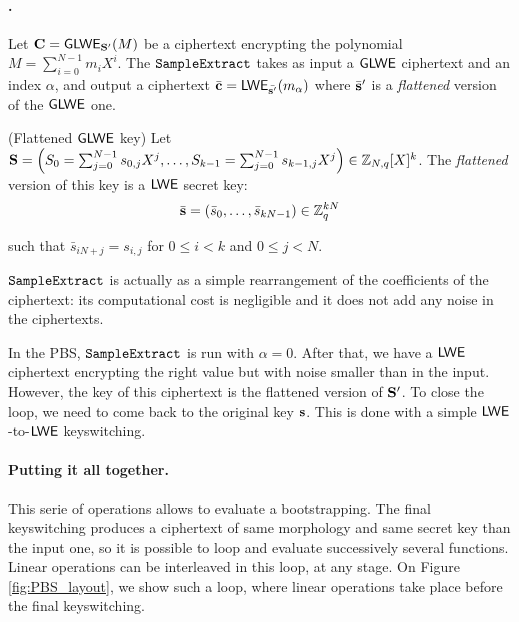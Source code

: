 \paragraph{\SampleExtract.}
Let $\mathbf C = \textsf{GLWE}_{\mathbf S'}(M)$ be a ciphertext encrypting the polynomial $M = \sum_{i=0}^{N-1} m_i X^i$. The $\texttt{SampleExtract}$ takes as input a $\textsf{GLWE}$ ciphertext and an index $\alpha$, and output a ciphertext $\bar{\mathbf c} = \textsf{LWE}_{\bar{\mathbf s'}}(m_\alpha)$ where $\bar {\mathbf s}'$ is a \textit{flattened} version of the $\textsf{GLWE}$ one. 

\begin{definition} (Flattened $\textsf{GLWE}$ key)
	Let $\mathbf S = \left ( S_0 = \sum_{j=0}^{N-1} s_{0, j} X^j, \dots,  S_{k-1} = \sum_{j=0}^{N-1} s_{k-1, j} X^j\right ) \in \mathbb{Z}_{N,q}[X]^k$. The \textit{flattened} version of this key is a $\textsf{LWE}$ secret key:
	\[
		\bar{\mathbf s} =  (\bar s_0, \dots, \bar s_{kN-1}) \in \mathbb{Z}_q^{kN}
	\] 
	
	such that $\bar s_{iN + j} = s_{i, j}$ for $0 \le i < k$ and $0 \le j < N$.
\end{definition}

$\texttt{SampleExtract}$ is actually as a simple rearrangement of the coefficients of the ciphertext: its computational cost is negligible and it does not add any noise in the ciphertexts.






In the PBS, $\texttt{SampleExtract}$ is run with $\alpha = 0$. After that, we have a $\textsf{LWE}$ ciphertext encrypting the right value but with noise smaller than in the input. However, the key of this ciphertext is the flattened version of $\mathbf S'$. To close the loop, we need to come back to the original key $\mathbf s$. This is done with a simple $\textsf{LWE}$-to-$\textsf{LWE}$ keyswitching.



\paragraph{Putting it all together.}
This serie of operations allows to evaluate a bootstrapping. The final keyswitching produces a ciphertext of same morphology and same secret key than the input one, so it is possible to loop and evaluate successively several functions. Linear operations can be interleaved in this loop, at any stage. On Figure \ref{fig:PBS_layout}, we show such a loop, where linear operations take place before the final keyswitching.



